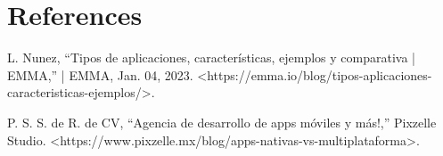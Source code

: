 \documentclass[conference]{IEEEtran}
\begin{document}
	\section{References}
	\begin{thebibliography}{1}
		 L. Nunez, “Tipos de aplicaciones, características, ejemplos y comparativa | EMMA,” | EMMA, Jan. 04, 2023. \textless https://emma.io/blog/tipos-aplicaciones-caracteristicas-ejemplos/\textgreater.
		
		 P. S. S. de R. de CV, “Agencia de desarrollo de apps móviles y más!,” Pixzelle Studio. \textless https://www.pixzelle.mx/blog/apps-nativas-vs-multiplataforma\textgreater.
	\end{thebibliography}
	
\end{document}
